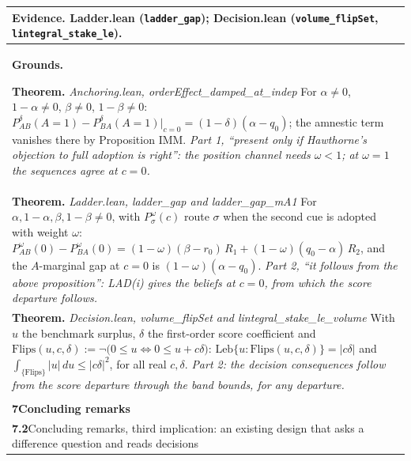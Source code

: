 \documentclass[10pt]{article}
\theoremstyle{definition}
\newlength{\fullw}\setlength{\fullw}{25.9cm}
\newcommand{\entryhead}[2]{\multicolumn{3}{|l|}{\rule{0pt}{2.6ex}\large\textbf{#1}\quad #2} \\ \hline}
\begin{document}
{\begin{longtable}{|p{0.9cm}|p{12.2cm}|p{12.2cm}|}
\multicolumn{3}{|p{\fullw}|}{\textbf{Evidence.} Ladder.lean (\texttt{ladder\_gap}); Decision.lean (\texttt{volume\_flipSet}, \texttt{lintegral\_stake\_le}).} \\ \hline
\multicolumn{3}{|p{\fullw}|}{\textbf{Grounds.}\par \textbf{Theorem.} \textit{Anchoring.lean, orderEffect\_damped\_at\_indep} \newline For $\alpha\neq0$, $1-\alpha\neq0$, $\beta\neq0$, $1-\beta\neq0$:
$P^{\delta}_{AB}(A{=}1)-P^{\delta}_{BA}(A{=}1)\big|_{c=0}=(1-\delta)(\alpha-q_0)$; the
amnestic term vanishes there by Proposition IMM. \newline \textit{Part 1, ``present only if Hawthorne's objection to full adoption is right'': the position channel needs $\omega<1$; at $\omega=1$ the sequences agree at $c=0$.}} \\
\multicolumn{3}{|p{\fullw}|}{\textbf{Theorem.} \textit{Ladder.lean, ladder\_gap and ladder\_gap\_mA1} \newline For $\alpha,1-\alpha,\beta,1-\beta\neq0$, with $P^{\omega}_{\sigma}(c)$ route $\sigma$ when the
second cue is adopted with weight $\omega$:
$P^{\omega}_{AB}(0)-P^{\omega}_{BA}(0)=(1-\omega)(\beta-r_0)\,R_1+(1-\omega)(q_0-\alpha)\,R_2$, and
the $A$-marginal gap at $c=0$ is $(1-\omega)(\alpha-q_0)$. \newline \textit{Part 2, ``it follows from the above proposition'': LAD(i) gives the beliefs at $c=0$, from which the score departure follows.}} \\
\multicolumn{3}{|p{\fullw}|}{\textbf{Theorem.} \textit{Decision.lean, volume\_flipSet and lintegral\_stake\_le\_volume} \newline With $u$ the benchmark surplus, $\delta$ the first-order score
coefficient and $\mathrm{Flips}(u,c,\delta) := \neg\big(0\le u \iff 0\le u + c\delta\big)$:
$\mathrm{Leb}\{u : \mathrm{Flips}(u,c,\delta)\} = |c\delta|$ and
$\int_{\{\mathrm{Flips}\}} |u|\,du \le |c\delta|^2$, for all real $c,\delta$. \newline \textit{Part 2: the decision consequences follow from the score departure through the band bounds, for any departure.}} \\ \hline
\multicolumn{3}{|l|}{} \\ \hline
\multicolumn{3}{|l|}{\rule{0pt}{3.2ex}\Large\textbf{7\quad Concluding remarks}} \\ \hline\hline
\entryhead{7.2}{Concluding remarks, third implication: an existing design that asks a difference question and reads decisions\quad{\footnotesize\textit{(formerly C.19)}}}

\end{longtable}}
\end{document}
